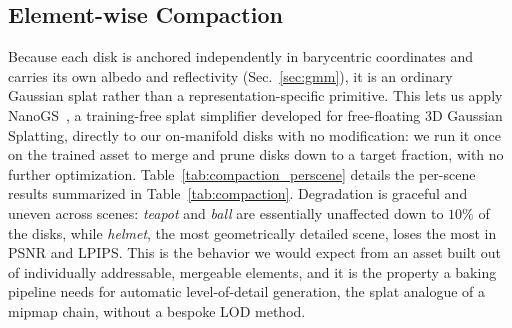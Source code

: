 \subsection{Element-wise Compaction}
\label{app:compaction}
Because each disk is anchored independently in barycentric coordinates and carries its own albedo
and reflectivity (Sec.~\ref{sec:gmm}), it is an ordinary Gaussian splat rather than a representation-specific
primitive. This lets us apply NanoGS~\citep{nanogs}, a training-free splat simplifier developed for
free-floating 3D Gaussian Splatting, directly to our on-manifold disks with no modification: we run
it once on the trained asset to merge and prune disks down to a target fraction, with no further
optimization. Table~\ref{tab:compaction_perscene} details the per-scene results summarized in
Table~\ref{tab:compaction}. Degradation is graceful and uneven across scenes: \emph{teapot} and
\emph{ball} are essentially unaffected down to $10\%$ of the disks, while \emph{helmet}, the most
geometrically detailed scene, loses the most in PSNR and LPIPS. This is the behavior we would expect
from an asset built out of individually addressable, mergeable elements, and it is the property a
baking pipeline needs for automatic level-of-detail generation, the splat analogue of a mipmap
chain, without a bespoke LOD method.


